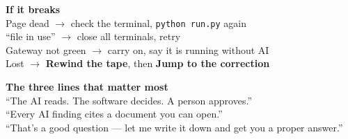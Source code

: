 \documentclass[11pt,a4paper]{article}
\newcommand{\ui}[1]{\textbf{#1}}          %
\begin{document}
\vspace{0.4em}
\begin{tcolorbox}[colback=warnbg,colframe=warnline,boxrule=0.4pt,arc=2pt]
\textbf{If it breaks}\\[2pt]
Page dead $\rightarrow$ check the terminal, \texttt{python run.py} again\\
``file in use'' $\rightarrow$ close all terminals, retry\\
Gateway not green $\rightarrow$ carry on, say it is running without AI\\
Lost $\rightarrow$ \ui{Rewind the tape}, then \ui{Jump to the correction}
\end{tcolorbox}

\vspace{0.4em}
\begin{tcolorbox}[colback=saybg,colframe=accent,boxrule=0pt,leftrule=3pt,arc=0pt]
\textbf{The three lines that matter most}\\[4pt]
``The AI reads. The software decides. A person approves.''\\[3pt]
``Every AI finding cites a document you can open.''\\[3pt]
``That's a good question --- let me write it down and get you a proper
answer.''
\end{tcolorbox}
\end{document}
